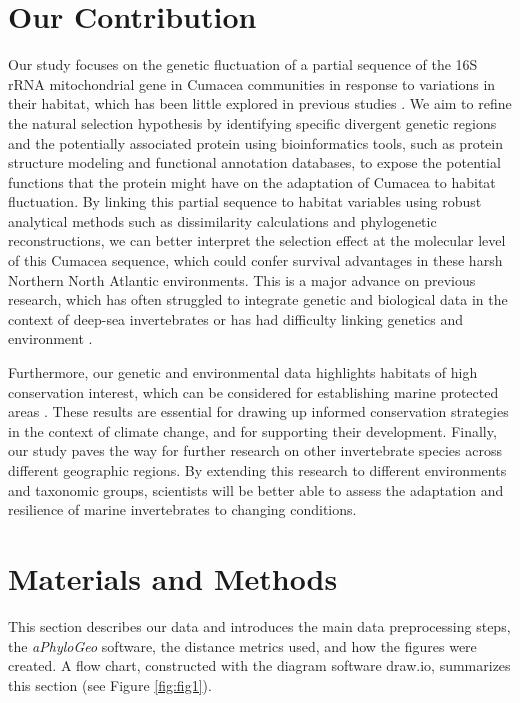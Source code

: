 \section{Our Contribution}\label{contribution}
Our study focuses on the genetic fluctuation of a partial sequence of the 16S rRNA mitochondrial gene in Cumacea communities in response to variations in their habitat, which has been little explored in previous studies \citep{grassle1992deep, rex2000latitudinal}. We aim to refine the natural selection hypothesis by identifying specific divergent genetic regions and the potentially associated protein using bioinformatics tools, such as protein structure modeling and functional annotation databases, to expose the potential functions that the protein might have on the adaptation of Cumacea to habitat fluctuation. By linking this partial sequence to habitat variables using robust analytical methods such as dissimilarity calculations and phylogenetic reconstructions, we can better interpret the selection effect at the molecular level of this Cumacea sequence, which could confer survival advantages in these harsh Northern North Atlantic environments. This is a major advance on previous research, which has often struggled to integrate genetic and biological data in the context of deep-sea invertebrates \citep{etter1990population, vrijenhoek2009cryptic} or has had difficulty linking genetics and environment \citep{manel2003landscape, balkenhol2009statistical}.

Furthermore, our genetic and environmental data highlights habitats of high conservation interest, which can be considered for establishing marine protected areas \citep{levin2009ecological}. These results are essential for drawing up informed conservation strategies in the context of climate change, and for supporting their development. Finally, our study paves the way for further research on other invertebrate species across different geographic regions. By extending this research to different environments and taxonomic groups, scientists will be better able to assess the adaptation and resilience of marine invertebrates to changing conditions.

\section{Materials and Methods}\label{materials-methods}
This section describes our data and introduces the main data preprocessing steps, the \textit{aPhyloGeo} software, the distance metrics used, and how the figures were created. A flow chart, constructed with the diagram software draw.io, summarizes this section (see Figure \ref{fig:fig1}).

